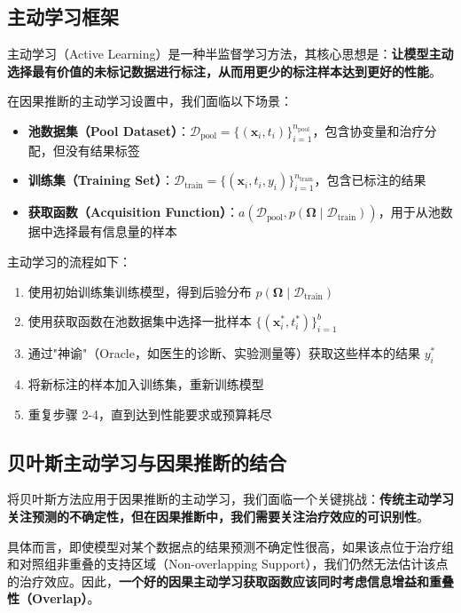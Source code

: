 \documentclass[12pt]{article}
\begin{document}
\subsection{主动学习框架}

主动学习（Active Learning）是一种半监督学习方法，其核心思想是：\textbf{让模型主动选择最有价值的未标记数据进行标注，从而用更少的标注样本达到更好的性能}。

在因果推断的主动学习设置中，我们面临以下场景：
\begin{itemize}
\item \textbf{池数据集（Pool Dataset）}：$\mathcal{D}_{\text{pool}} = \{(\mathbf{x}_i, t_i)\}_{i=1}^{n_{\text{pool}}}$，包含协变量和治疗分配，但没有结果标签
\item \textbf{训练集（Training Set）}：$\mathcal{D}_{\text{train}} = \{(\mathbf{x}_i, t_i, y_i)\}_{i=1}^{n_{\text{train}}}$，包含已标注的结果
\item \textbf{获取函数（Acquisition Function）}：$a(\mathcal{D}_{\text{pool}}, p(\boldsymbol{\Omega} \mid \mathcal{D}_{\text{train}}))$，用于从池数据中选择最有信息量的样本
\end{itemize}

主动学习的流程如下：
\begin{enumerate}
\item 使用初始训练集训练模型，得到后验分布 $p(\boldsymbol{\Omega} \mid \mathcal{D}_{\text{train}})$
\item 使用获取函数在池数据集中选择一批样本 $\{(\mathbf{x}_i^*, t_i^*)\}_{i=1}^b$
\item 通过"神谕"（Oracle，如医生的诊断、实验测量等）获取这些样本的结果 $y_i^*$
\item 将新标注的样本加入训练集，重新训练模型
\item 重复步骤 2-4，直到达到性能要求或预算耗尽
\end{enumerate}

\subsection{贝叶斯主动学习与因果推断的结合}

将贝叶斯方法应用于因果推断的主动学习，我们面临一个关键挑战：\textbf{传统主动学习关注预测的不确定性，但在因果推断中，我们需要关注治疗效应的可识别性}。

具体而言，即使模型对某个数据点的结果预测不确定性很高，如果该点位于治疗组和对照组非重叠的支持区域（Non-overlapping Support），我们仍然无法估计该点的治疗效应。因此，\textbf{一个好的因果主动学习获取函数应该同时考虑信息增益和重叠性（Overlap）}。
\end{document}
